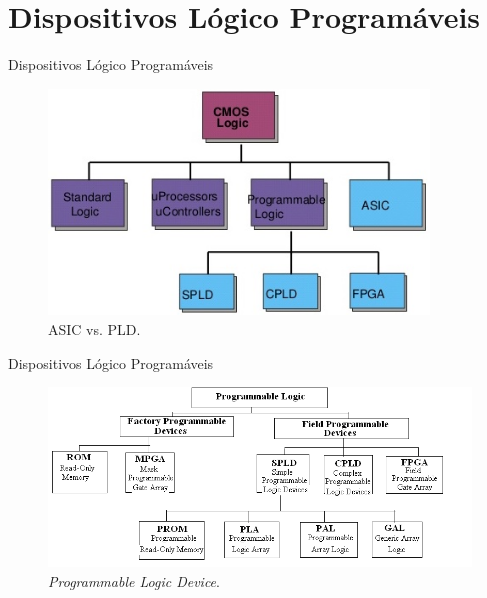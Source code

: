 \documentclass[aspectratio=169]{beamer}
\begin{document}
\section{Dispositivos Lógico Programáveis}
	\begin{frame}{Dispositivos Lógico Programáveis}
		\begin{figure}[H]
			\centering
			\includegraphics[width=0.9\textwidth]{img/intro/arvore.jpg}
			\caption{ASIC vs. PLD.}
		\end{figure}
	\end{frame}
	
	\begin{frame}{Dispositivos Lógico Programáveis}
		\begin{figure}[H]
			\centering
			\includegraphics[width=1.08\textwidth]{img/intro/arvore-pld.png}
			\caption{\textit{Programmable Logic Device}.}
		\end{figure}
	\end{frame}
	
\end{document}
